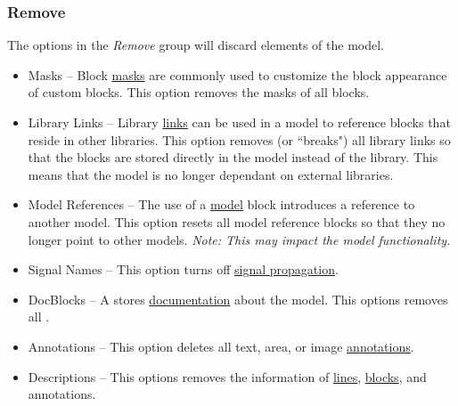 \documentclass{article}
\begin{document}
\subsubsection{Remove}
The options in the \emph{Remove} group will discard elements of the model.

\begin{itemize}
	\item Masks -- Block \href{https://www.mathworks.com/help/simulink/ug/block-masks.html}{masks} are commonly used to customize the block appearance of custom blocks. This option removes the masks of all blocks. 
	
	\item Library Links -- Library \href{https://www.mathworks.com/help/simulink/ug/creating-and-working-with-linked-blocks.html}{links} can be used in a model to reference blocks that reside in other libraries. This option removes (or ``breaks") all library links so that the blocks are stored directly in the model instead of the library. This means that the model is no longer dependant on external libraries.
	
	\item Model References -- The use of a \href{https://www.mathworks.com/help/simulink/slref/model.html}{model} block introduces a reference to another model. This option resets all model reference blocks so that they no longer point to other models. \emph{Note: This may impact the model functionality.}
	
	\item Signal Names -- This option turns off \href{https://www.mathworks.com/help/simulink/ug/signal-label-propagation.html}{signal propagation}.
	
	\item DocBlocks -- A \docblock stores \href{https://www.mathworks.com/help/simulink/slref/docblock.html}{documentation} about the model. This options removes all .
	
	\item Annotations -- This option deletes all text, area, or image \href{https://www.mathworks.com/help/simulink/ug/annotations.html}{annotations}.
	
	\item Descriptions -- This options removes the  information of \href{https://www.mathworks.com/help/simulink/ug/signal-basics.html#bs9gzwp}{lines}, \href{https://www.mathworks.com/help/simulink/ug/block-properties-dialog-box.html}{blocks}, and annotations. 
	

\end{itemize}
\end{document}
